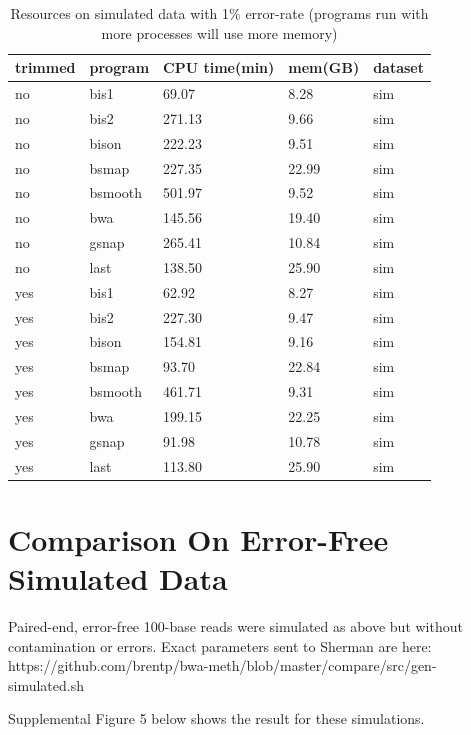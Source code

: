\documentclass[12pt]{article}
\begin{document}
\begin{table}[H]
    \centering
    \caption{Resources on simulated data with 1\% error-rate
(programs run with more processes will use more memory)}
    \begin{tabular}{lllll} \hline
    trimmed & program & CPU time(min) & mem(GB) & dataset \\ \hline

no &    bis1 & 69.07 & 8.28 & sim \\
no &    bis2 & 271.13 & 9.66 & sim \\
no &    bison & 222.23 & 9.51 & sim \\
no &    bsmap & 227.35 & 22.99 & sim \\
no &    bsmooth & 501.97 & 9.52 & sim \\
no &    bwa & 145.56 & 19.40 & sim \\
no &    gsnap & 265.41 & 10.84 & sim \\
no &    last & 138.50 & 25.90 & sim \\

yes &    bis1 & 62.92 & 8.27 & sim \\
yes &    bis2 & 227.30 & 9.47 & sim \\
yes &    bison & 154.81 & 9.16 & sim \\
yes &    bsmap & 93.70 & 22.84 & sim \\
yes &    bsmooth & 461.71 & 9.31 & sim \\
yes &    bwa & 199.15 & 22.25 & sim \\
yes &    gsnap & 91.98 & 10.78 & sim \\
yes &    last & 113.80 & 25.90 & sim \\


    \end{tabular}
\end{table}

\section{Comparison On Error-Free Simulated Data}

Paired-end, error-free 100-base reads were simulated as above but
without contamination or errors.
Exact parameters sent to Sherman are here:
https://github.com/brentp/bwa-meth/blob/master/compare/src/gen-simulated.sh

Supplemental Figure 5 below shows the result for these simulations.
    
\end{document}
